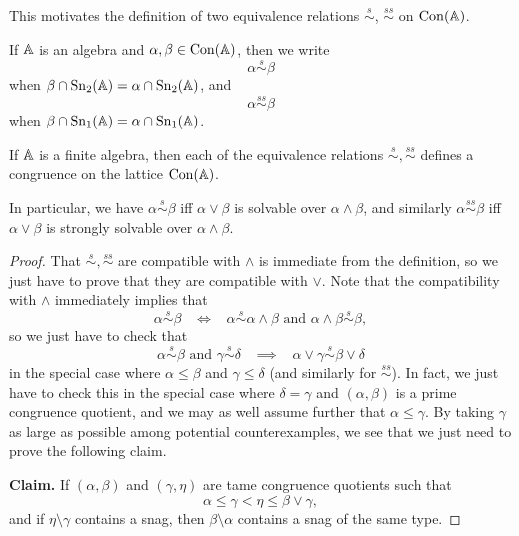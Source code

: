 \begin{appendices}
This motivates the definition of two equivalence relations $\stackrel{s}{\sim}$, $\stackrel{ss}{\sim}$ on $\operatorname{Con}(\mathbb{A})$.

\begin{defn} If $\mathbb{A}$ is an algebra and $\alpha, \beta \in \operatorname{Con}(\mathbb{A})$, then we write
\[
\alpha \stackrel{s}{\sim} \beta
\]
when $\beta \cap \operatorname{Sn}_2(\mathbb{A}) = \alpha \cap \operatorname{Sn}_2(\mathbb{A})$, and
\[
\alpha \stackrel{ss}{\sim} \beta
\]
when $\beta \cap \operatorname{Sn}_1(\mathbb{A}) = \alpha \cap \operatorname{Sn}_1(\mathbb{A})$.
\end{defn}

\begin{thm}\label{thm-locally-solvable-congruence} If $\mathbb{A}$ is a finite algebra, then each of the equivalence relations $\stackrel{s}{\sim}, \stackrel{ss}{\sim}$ defines a congruence on the lattice $\operatorname{Con}(\mathbb{A})$.

In particular, we have $\alpha \stackrel{s}{\sim} \beta$ iff $\alpha \vee \beta$ is solvable over $\alpha \wedge \beta$, and similarly $\alpha \stackrel{ss}{\sim} \beta$ iff $\alpha \vee \beta$ is strongly solvable over $\alpha \wedge \beta$.
\end{thm}
\begin{proof} That $\stackrel{s}{\sim}, \stackrel{ss}{\sim}$ are compatible with $\wedge$ is immediate from the definition, so we just have to prove that they are compatible with $\vee$. Note that the compatibility with $\wedge$ immediately implies that
\[
\alpha \stackrel{s}{\sim} \beta \;\;\; \iff \;\;\; \alpha \stackrel{s}{\sim} \alpha \wedge \beta \text{ and } \alpha \wedge \beta \stackrel{s}{\sim} \beta,
\]
so we just have to check that
\[
\alpha \stackrel{s}{\sim} \beta \text{ and } \gamma \stackrel{s}{\sim} \delta \;\;\; \implies \;\;\; \alpha \vee \gamma \stackrel{s}{\sim} \beta \vee \delta
\]
in the special case where $\alpha \le \beta$ and $\gamma \le \delta$ (and similarly for $\stackrel{ss}{\sim}$). In fact, we just have to check this in the special case where $\delta = \gamma$ and $(\alpha,\beta)$ is a prime congruence quotient, and we may as well assume further that $\alpha \le \gamma$. By taking $\gamma$ as large as possible among potential counterexamples, we see that we just need to prove the following claim.

{\bf Claim.} If $(\alpha, \beta)$ and $(\gamma, \eta)$ are tame congruence quotients such that
\[
\alpha \le \gamma < \eta \le \beta \vee \gamma,
\]
and if $\eta \setminus \gamma$ contains a snag, then $\beta \setminus \alpha$ contains a snag of the same type.


\end{proof}
\end{appendices}
